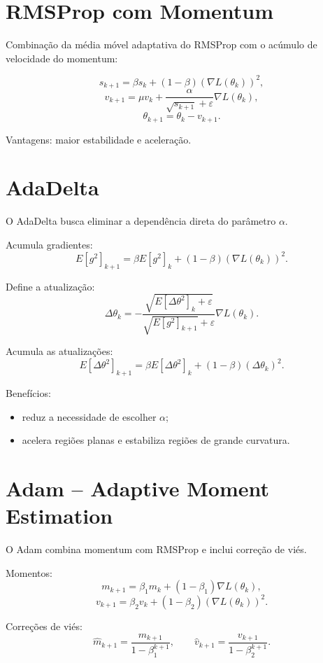 \documentclass[9pt,a4paper]{extarticle}
\begin{document}
\section{RMSProp com Momentum}

Combinação da média móvel adaptativa do RMSProp com o acúmulo de velocidade do momentum:

\[
s_{k+1} = \beta s_k + (1-\beta)(\nabla L(\theta_k))^2,
\]
\[
v_{k+1} = \mu v_k + \frac{\alpha}{\sqrt{s_{k+1}}+\varepsilon}\nabla L(\theta_k),
\]
\[
\theta_{k+1} = \theta_k - v_{k+1}.
\]

Vantagens: maior estabilidade e aceleração.

\section{AdaDelta}

O AdaDelta busca eliminar a dependência direta do parâmetro $\alpha$.

Acumula gradientes:
\[
E[g^2]_{k+1} = \beta E[g^2]_k + (1-\beta)(\nabla L(\theta_k))^2.
\]

Define a atualização:
\[
\Delta\theta_k = -\frac{\sqrt{E[\Delta\theta^2]_k + \varepsilon}}{\sqrt{E[g^2]_{k+1}}+\varepsilon}\nabla L(\theta_k).
\]

Acumula as atualizações:
\[
E[\Delta\theta^2]_{k+1} = \beta E[\Delta\theta^2]_k + (1-\beta)(\Delta\theta_k)^2.
\]

Benefícios:
\begin{itemize}
    \item reduz a necessidade de escolher $\alpha$;
    \item acelera regiões planas e estabiliza regiões de grande curvatura.
\end{itemize}

\section{Adam -- Adaptive Moment Estimation}

O Adam combina momentum com RMSProp e inclui correção de viés.

Momentos:
\[
m_{k+1} = \beta_1 m_k + (1-\beta_1)\nabla L(\theta_k),
\]
\[
v_{k+1} = \beta_2 v_k + (1-\beta_2)(\nabla L(\theta_k))^2.
\]

Correções de viés:
\[
\hat{m}_{k+1} = \frac{m_{k+1}}{1-\beta_1^{k+1}}, \qquad
\hat{v}_{k+1} = \frac{v_{k+1}}{1-\beta_2^{k+1}}.
\]
\end{document}
